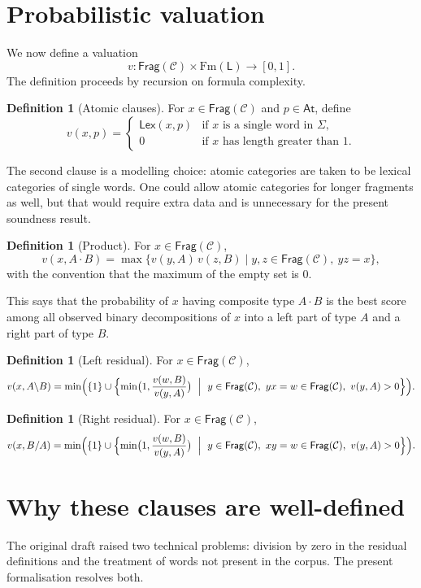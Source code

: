 \documentclass[12pt,a4paper]{report}
\theoremstyle{definition}
\newtheorem{definition}[theorem]{Definition}
\newcommand{\LC}{\mathsf{L}}
\newcommand{\At}{\mathsf{At}}
\newcommand{\Frag}{\mathsf{Frag}}
\newcommand{\Lex}{\mathsf{Lex}}
\newcommand{\concat}{\mathbin{\cdot}}
\begin{document}
\section{Probabilistic valuation}
We now define a valuation
\[
v : \Frag(\mathcal C) \times \mathrm{Fm}(\LC) \to [0,1].
\]
The definition proceeds by recursion on formula complexity.

\begin{definition}[Atomic clauses]
For $x \in \Frag(\mathcal C)$ and $p \in \At$, define
\[
v(x,p) =
\begin{cases}
\Lex(x,p) & \text{if $x$ is a single word in $\Sigma$,}\\
0 & \text{if $x$ has length greater than $1$.}
\end{cases}
\]
\end{definition}

The second clause is a modelling choice: atomic categories are taken to be lexical categories of
single words. One could allow atomic categories for longer fragments as well, but that would
require extra data and is unnecessary for the present soundness result.

\begin{definition}[Product]
For $x \in \Frag(\mathcal C)$,
\[
v(x,A\concat B)
= \max\{v(y,A)\,v(z,B) \mid y,z \in \Frag(\mathcal C),\ yz=x\},
\]
with the convention that the maximum of the empty set is $0$.
\end{definition}

This says that the probability of $x$ having composite type $A\concat B$ is the best score among
all observed binary decompositions of $x$ into a left part of type $A$ and a right part of type
$B$.

\begin{definition}[Left residual]
For $x \in \Frag(\mathcal C)$,
\[
v(x,A\backslash B)
= \min\Bigl(\{1\} \cup
\Bigl\{\min\bigl(1,\frac{v(w,B)}{v(y,A)}\bigr)
\ \Bigm|\ y \in \Frag(\mathcal C),\ yx=w \in \Frag(\mathcal C),\ v(y,A)>0\Bigr\}\Bigr).
\]
\end{definition}

\begin{definition}[Right residual]
For $x \in \Frag(\mathcal C)$,
\[
v(x,B/A)
= \min\Bigl(\{1\} \cup
\Bigl\{\min\bigl(1,\frac{v(w,B)}{v(y,A)}\bigr)
\ \Bigm|\ y \in \Frag(\mathcal C),\ xy=w \in \Frag(\mathcal C),\ v(y,A)>0\Bigr\}\Bigr).
\]
\end{definition}

\section{Why these clauses are well-defined}
The original draft raised two technical problems: division by zero in the residual definitions and
the treatment of words not present in the corpus. The present formalisation resolves both.
\end{document}
